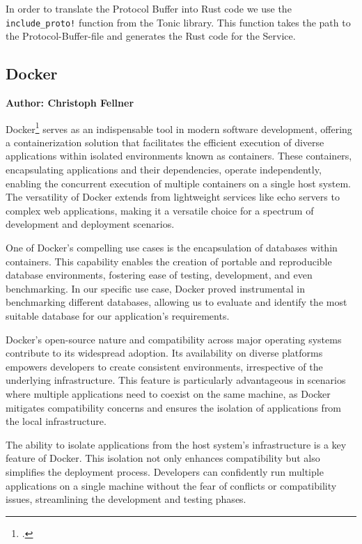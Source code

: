 In order to translate the Protocol Buffer into Rust code we use the \verb+include_proto!+ function from the Tonic library. This function takes the path to the 
Protocol-Buffer-file and generates the Rust code for the Service.

\subsection{Docker}
\textbf{Author: Christoph Fellner}

Docker\footcite{docker} serves as an indispensable tool in modern software development, offering a containerization solution that facilitates the efficient 
execution of diverse applications within isolated environments known as containers. These containers, encapsulating applications and their dependencies, operate 
independently, enabling the concurrent execution of multiple containers on a single host system. The versatility of Docker extends from lightweight services 
like echo servers to complex web applications, making it a versatile choice for a spectrum of development and deployment scenarios.\newline

One of Docker's compelling use cases is the encapsulation of databases within containers. This capability enables the creation of portable and reproducible 
database environments, fostering ease of testing, development, and even benchmarking. In our specific use case, Docker proved instrumental in benchmarking 
different databases, allowing us to evaluate and identify the most suitable database for our application's requirements.\newline

Docker's open-source nature and compatibility across major operating systems contribute to its widespread adoption. Its availability on diverse platforms 
empowers developers to create consistent environments, irrespective of the underlying infrastructure. This feature is particularly advantageous in scenarios 
where multiple applications need to coexist on the same machine, as Docker mitigates compatibility concerns and ensures the isolation of applications from the 
local infrastructure.\newline

The ability to isolate applications from the host system's infrastructure is a key feature of Docker. This isolation not only enhances compatibility but also 
simplifies the deployment process. Developers can confidently run multiple applications on a single machine without the fear of conflicts or compatibility 
issues, streamlining the development and testing phases.\newline

